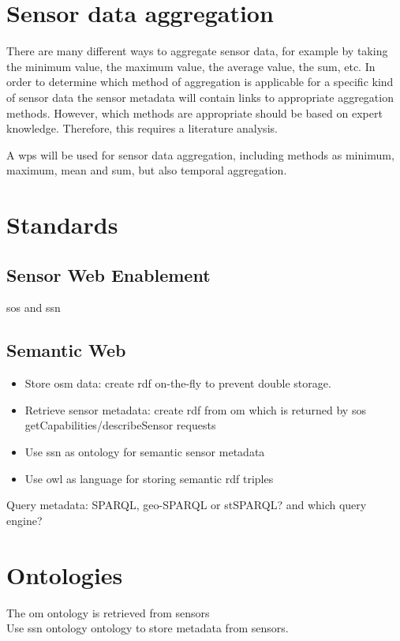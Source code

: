 \section{Sensor data aggregation}
There are many different ways to aggregate sensor data, for example by taking the minimum value, the maximum value, the average value, the sum, etc. In order to determine which method of aggregation is applicable for a specific kind of sensor data the sensor metadata will contain links to appropriate aggregation methods. However, which methods are appropriate should be based on expert knowledge. Therefore, this requires a literature analysis. 


\iffalse

A \ac{wps} will be used for sensor data aggregation, including methods as minimum, maximum, mean and sum, but also temporal aggregation. 


\section{Standards}
\subsection{Sensor Web Enablement}
\ac{sos} and \ac{ssn}

\subsection{Semantic Web}

\begin{itemize}
	\item Store \ac{osm} data: create \ac{rdf} on-the-fly to prevent double storage. 
	\item Retrieve sensor metadata: create \ac{rdf} from \ac{om} which is returned by \ac{sos} getCapabilities/describeSensor requests
	\item Use \ac{ssn} as ontology for semantic sensor metadata 
	\item Use \ac{owl} as language for storing semantic \ac{rdf} triples
\end{itemize}


Query metadata: SPARQL, geo-SPARQL or stSPARQL? and which query engine?

\section{Ontologies}
The \ac{om} ontology is retrieved from sensors\\
Use \ac{ssn} ontology ontology to store metadata from sensors.  

